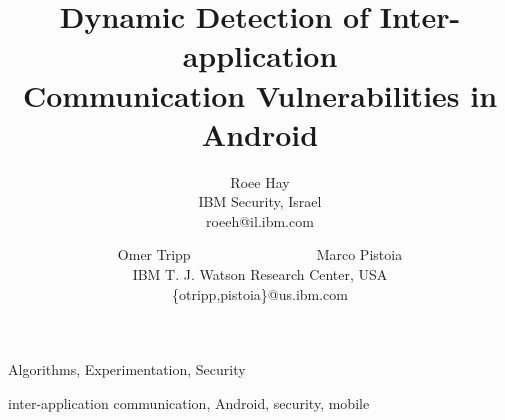 \documentclass[pldi]{sig-alternate}
\begin{document}
	

\title{Dynamic Detection of Inter-application\\Communication Vulnerabilities in Android}

\author{
		Roee Hay \\
		IBM Security, Israel \\
		{\Large \textsf{roeeh@il.ibm.com}}
		\and
		Omer Tripp~~~~~~~~~~~~~~~~~~Marco Pistoia\\
		IBM T. J. Watson Research Center, USA \\
		{\Large \textsf{\{otripp,pistoia\}@us.ibm.com}}
}

\maketitle




\terms
Algorithms, Experimentation, Security

\keywords
inter-application communication, Android, security, mobile











%

%



%





\newpage
\balance



\end{document}
